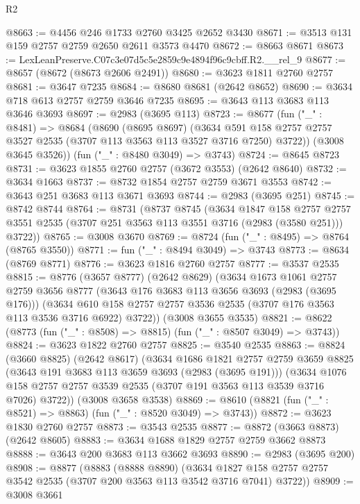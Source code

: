 \begin{lexlean}{R2}
\begin{coremodule}
@8663 := @4456 @246 @1733 @2760 @3425 @2652 @3430
@8671 := @3513 @131 @159 @2757 @2759 @2650 @2611 @3573 @4470
@8672 := @8663 @8671
@8673 := LexLeanPreserve.C07c3e07d5c5e2859c9e4894f96c9cbff.R2.__rel_9
@8677 := @8657 (@8672 (@8673 @2606 @2491))
@8680 := @3623 @1811 @2760 @2757
@8681 := @3647 @7235
@8684 := @8680 @8681 (@2642 @8652)
@8690 := @3634 @718 @613 @2757 @2759 @3646 @7235
@8695 := @3643 @113 @3683 @113 @3646 @3693
@8697 := @2983 (@3695 @113)
@8723 := @8677
    (fun ("_" : @8481) =>
    @8684
      (@8690
        (@8695 @8697)
        (@3634 @591 @158 @2757 @2757 @3527 @2535 (@3707 @113 @3563 @113 @3527 @3716 @7250) @3722))
      (@3008 @3645 @3526))
    (fun ("_" : @8480 @3049) => @3743)
@8724 := @8645 @8723
@8731 := @3623 @1855 @2760 @2757 (@3672 @3553) (@2642 @8640)
@8732 := @3634 @1663
@8737 := @8732 @1854 @2757 @2759 @3671 @3553
@8742 := @3643 @251 @3683 @113 @3671 @3693
@8744 := @2983 (@3695 @251)
@8745 := @8742 @8744
@8764 := @8731
    (@8737
      @8745
      (@3634
        @1847
        @158
        @2757
        @2757
        @3551
        @2535
        (@3707 @251 @3563 @113 @3551 @3716 (@2983 (@3580 @251)))
        @3722))
@8765 := @3008 @3670
@8769 := @8724 (fun ("_" : @8495) => @8764 (@8765 @3550))
@8771 := fun ("_" : @8494 @3049) => @3743
@8773 := @8634 (@8769 @8771)
@8776 := @3623 @1816 @2760 @2757
@8777 := @3537 @2535
@8815 := @8776
    (@3657 @8777)
    (@2642 @8629)
    (@3634
      @1673
      @1061
      @2757
      @2759
      @3656
      @8777
      (@3643 @176 @3683 @113 @3656 @3693 (@2983 (@3695 @176)))
      (@3634 @610 @158 @2757 @2757 @3536 @2535 (@3707 @176 @3563 @113 @3536 @3716 @6922) @3722))
    (@3008 @3655 @3535)
@8821 := @8622 (@8773 (fun ("_" : @8508) => @8815) (fun ("_" : @8507 @3049) => @3743))
@8824 := @3623 @1822 @2760 @2757
@8825 := @3540 @2535
@8863 := @8824
    (@3660 @8825)
    (@2642 @8617)
    (@3634
      @1686
      @1821
      @2757
      @2759
      @3659
      @8825
      (@3643 @191 @3683 @113 @3659 @3693 (@2983 (@3695 @191)))
      (@3634 @1076 @158 @2757 @2757 @3539 @2535 (@3707 @191 @3563 @113 @3539 @3716 @7026) @3722))
    (@3008 @3658 @3538)
@8869 := @8610 (@8821 (fun ("_" : @8521) => @8863) (fun ("_" : @8520 @3049) => @3743))
@8872 := @3623 @1830 @2760 @2757
@8873 := @3543 @2535
@8877 := @8872 (@3663 @8873) (@2642 @8605)
@8883 := @3634 @1688 @1829 @2757 @2759 @3662 @8873
@8888 := @3643 @200 @3683 @113 @3662 @3693
@8890 := @2983 (@3695 @200)
@8908 := @8877
    (@8883
      (@8888 @8890)
      (@3634 @1827 @158 @2757 @2757 @3542 @2535 (@3707 @200 @3563 @113 @3542 @3716 @7041) @3722))
@8909 := @3008 @3661

\end{coremodule}
\end{lexlean}

